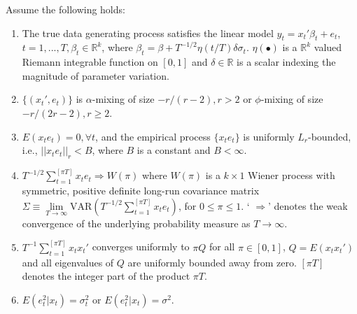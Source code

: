 \begin{Assumption}\label{asump:1}
Assume the following holds:
\begin{enumerate}
	\item The true data generating process satisfies the linear model $y_t = x_t'\beta_t + e_t$, $t=1,...,T,\beta_t \in \mathbb{R}^k$, where $\beta_t = \beta + T^{-1/2}\eta(t/T)\delta\sigma_t$. $\eta(\bullet)$ is a $\mathbb{R}^k$ valued Riemann integrable function on $[0,1]$ and $\delta \in \mathbb{R}$ is a scalar indexing the magnitude of parameter variation.
	\item $\{(x_t',e_t)\}$ is $\alpha$-mixing of size $-r/(r-2),r > 2$ or $\phi$-mixing of size $-r/(2r-2),r \geq 2$.
    \item $E(x_t e_t) = 0, \forall t$, and the empirical process $\{x_t e_t\}$ is uniformly $L_r$-bounded, i.e., $||x_t e_t||_{r} < B$, where $B$ is a constant and $B < \infty$.
    \item $T^{-1/2}\sum_{t=1}^{[\pi T]} x_t e_t \Rightarrow W(\pi)$ where $W(\pi)$ is a $k \times 1$ Wiener process with symmetric, positive definite long-run covariance matrix $\Sigma \equiv \lim\limits_{T\to \infty}\mathrm{VAR}(T^{-1/2}\sum_{t=1}^{[\pi T]} x_t e_t)$, for $0 \leq \pi \leq 1$. ` $\Rightarrow$' denotes the weak convergence of the underlying probability measure as $T \to \infty$.
	\item $T^{-1}\sum_{t=1}^{[\pi T]}x_t x_t'$ converges uniformly to $\pi Q$ for all $\pi \in [0,1]$, $Q = E(x_t x_t')$ and all eigenvalues of $Q$ are uniformly bounded away from zero. $[\pi T]$ denotes the integer part of the product $\pi T$.
	\item $E(e_t^{2}|x_t) = \sigma_t^{2}$ or $E(e_t^{2}|x_t) = \sigma^{2}$.
\end{enumerate}
\end{Assumption}
